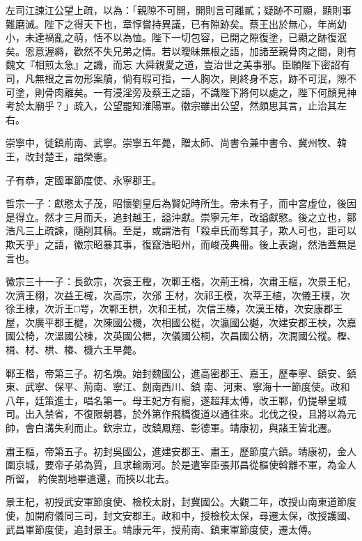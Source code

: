 \begin{pinyinscope}
 左司江諫江公望上疏，以為：「親隙不可開，開則言可離貳；疑跡不可顯，顯則事難磨滅。陛下之得天下也，章惇嘗持異議，已有隙跡矣。蔡王出於無心，年尚幼小，未達禍亂之萌，恬不以為恤。陛下一切包容，已開之隙復塗，已顯之跡復泯矣。恩意渥縟，歡然不失兄弟之情。若以曖昧無根之語，加諸至親骨肉之間，則有魏文『相煎太急』之譏，而忘
 大舜親愛之道，豈治世之美事邪。臣願陛下密詔有司，凡無根之言勿形案牘，倘有瑕可指，一人胸次，則終身不忘，跡不可泯，隙不可塗，則骨肉離矣。一有浸淫旁及蔡王之語，不識陛下將何以處之，陛下何顏見神考於太廟乎？」疏入，公望罷知淮陽軍。徽宗雖出公望，然頗思其言，止治其左右。



 崇寧中，徙鎮荊南、武寧。崇寧五年薨，贈太師、尚書令兼中書令、冀州牧、韓王，改封楚王，謚榮憲。



 子有恭，定國軍節度使、永寧郡王。



 哲宗一子：獻愍太子茂，昭懷劉皇后為賢妃時所生。帝未有子，而中宮虛位，後因是得立。然才三月而夭，追封越王，謚沖獻。崇寧元年，改謚獻愍。後之立也，鄒浩凡三上疏諫，隨削其稿。至是，或謂浩有「殺卓氏而奪其子，欺人可也，詎可以欺天乎」之語，徽宗昭暴其事，復竄浩昭州，而峻茂典冊。後上表謝，然浩蓋無是言也。



 徽宗三十一子：長欽宗，次袞王檉，次鄆王楷，次荊王楫，次肅王樞，次景王杞，次濟王栩，次益王棫，次高宗，次邠
 王材，次祁王模，次莘王植，次儀王樸，次徐王棣，次沂王□咢，次鄆王栱，次和王栻，次信王榛，次漢王椿，次安康郡王屋，次廣平郡王楗，次陳國公機，次相國公梃，次瀛國公樾，次建安郡王柍，次嘉國公椅，次溫國公棟，次英國公楒，次儀國公桐，次昌國公柄，次潤國公樅。檉、楫、材、栱、椿、機六王早薨。



 鄆王楷，帝第三子。初名煥。始封魏國公，進高密郡王、嘉王，歷奉寧、鎮安、鎮東、武寧、保平、荊南、寧江、劍南西川、鎮
 南、河東、寧海十一節度使。政和八年，廷策進士，唱名第一。母王妃方有寵，遂超拜太傅，改王鄆，仍提舉皇城司。出入禁省，不復限朝暮，於外第作飛橋復道以通往來。北伐之役，且將以為元帥，會白溝失利而止。欽宗立，改鎮鳳翔、彰德軍。靖康初，與諸王皆北遷。



 肅王樞，帝第五子。初封吳國公，進建安郡王、肅王，歷節度六鎮。靖康初，金人圍京城，要帝子弟為質，且求輸兩河。於是遣宰臣張邦昌從樞使斡離不軍，為金人所留，
 約俟割地畢遣還，而挾以北去。



 景王杞，初授武安軍節度使、檢校太尉，封冀國公。大觀二年，改授山南東道節度使，加開府儀同三司，封文安郡王。政和中，授檢校太保，尋遷太保，改授護國、武昌軍節度使，追封景王。靖康元年，授荊南、鎮東軍節度使，遷太傅。




\end{pinyinscope}
